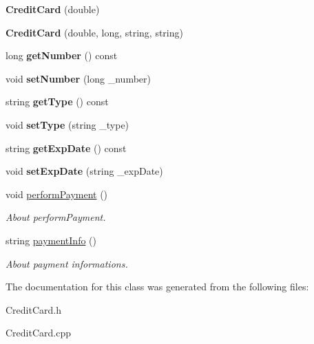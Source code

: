 \begin{DoxyCompactItemize}
\item 
\mbox{\label{classCreditCard_ac44cde50c1d912b02bf147d22da1b117}} 
{\bfseries Credit\+Card} (double)
\item 
\mbox{\label{classCreditCard_a6d9059ca027aa6ef903158a2efddc35d}} 
{\bfseries Credit\+Card} (double, long, string, string)
\item 
\mbox{\label{classCreditCard_a1190bb16e987bc6e0fd37467c30d643b}} 
long {\bfseries get\+Number} () const
\item 
\mbox{\label{classCreditCard_aa57cb564e21aef7a8b4f9213f3565992}} 
void {\bfseries set\+Number} (long \+\_\+number)
\item 
\mbox{\label{classCreditCard_a7706b969e15ac3e7b4397af600c5024f}} 
string {\bfseries get\+Type} () const
\item 
\mbox{\label{classCreditCard_a19cc344b1375f7698267999e424eabb3}} 
void {\bfseries set\+Type} (string \+\_\+type)
\item 
\mbox{\label{classCreditCard_ad644de7a42046b899b4f2fbb19fd833f}} 
string {\bfseries get\+Exp\+Date} () const
\item 
\mbox{\label{classCreditCard_a44c7385c4ed7dbb6f19565c01d84cdd4}} 
void {\bfseries set\+Exp\+Date} (string \+\_\+exp\+Date)
\item 
\mbox{\label{classCreditCard_ad41ae39d73adea22555db100311a5101}} 
void \hyperlink{classCreditCard_ad41ae39d73adea22555db100311a5101}{perform\+Payment} ()
\begin{DoxyCompactList}\small\item\em About perform\+Payment. \end{DoxyCompactList}\item 
\mbox{\label{classCreditCard_af4933bd75406444c8e91d9090b297858}} 
string \hyperlink{classCreditCard_af4933bd75406444c8e91d9090b297858}{payment\+Info} ()
\begin{DoxyCompactList}\small\item\em About payment informations. \end{DoxyCompactList}\end{DoxyCompactItemize}


The documentation for this class was generated from the following files\+:\begin{DoxyCompactItemize}
\item 
Credit\+Card.\+h\item 
Credit\+Card.\+cpp\end{DoxyCompactItemize}
